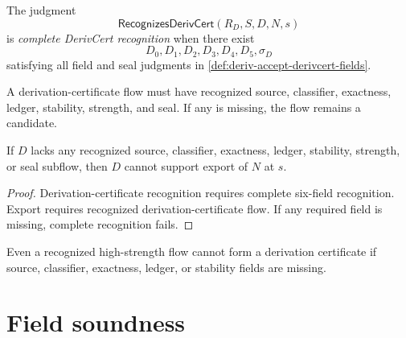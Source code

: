 \begin{definition}
\label{def:deriv-accept-complete-derivcert}
The judgment
$$
  \mathsf{RecognizesDerivCert}(R_D,S,D,N,s)
$$
is \emph{complete DerivCert recognition} when there exist
$$
  D_0,D_1,D_2,D_3,D_4,D_5,\sigma_D
$$
satisfying all field and seal judgments in \autoref{def:deriv-accept-derivcert-fields}.
\end{definition}

\begin{principle}
\label{prin:deriv-accept-no-derivcert-without-six}
A derivation-certificate flow must have recognized source, classifier, exactness, ledger, stability, strength, and seal. If any is missing, the flow remains a candidate.
\end{principle}

\begin{theorem}
\label{thm:deriv-accept-incomplete-derivcert-no-export}
If $D$ lacks any recognized source, classifier, exactness, ledger, stability, strength, or seal subflow, then $D$ cannot support export of $N$ at $s$.
\end{theorem}

\begin{proof}
Derivation-certificate recognition requires complete six-field recognition. Export requires recognized derivation-certificate flow. If any required field is missing, complete recognition fails.
\end{proof}

\begin{corollary}
\label{cor:deriv-accept-strength-alone-no-export}
Even a recognized high-strength flow cannot form a derivation certificate if source, classifier, exactness, ledger, or stability fields are missing.
\end{corollary}

\section{Field soundness}
\label{sec:deriv-accept-field-soundness}

